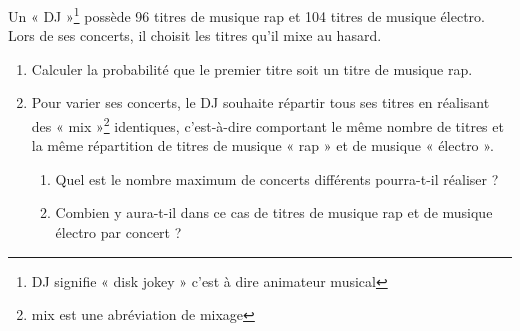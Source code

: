 
\medskip

Un « DJ »\footnote{DJ signifie « disk jokey » c'est à dire animateur musical} possède 96 titres de musique rap et 104 titres de musique électro. Lors
de ses concerts, il choisit les titres qu'il mixe au hasard.

\medskip

\begin{enumerate}
\item Calculer la probabilité que le premier titre soit un titre de musique rap.
\item Pour varier ses concerts, le DJ souhaite répartir tous ses titres en réalisant des « mix »\footnote{mix est une abréviation de mixage} identiques, c'est-à-dire comportant le même nombre de titres et la même
répartition de titres de musique « rap » et de musique « électro ».
	\begin{enumerate}
		\item Quel est le nombre maximum de concerts différents pourra-t-il réaliser ?
		\item Combien y aura-t-il dans ce cas de titres de musique rap et de musique
électro par concert ?
	\end{enumerate}
\end{enumerate}
\vspace{0.25cm}

